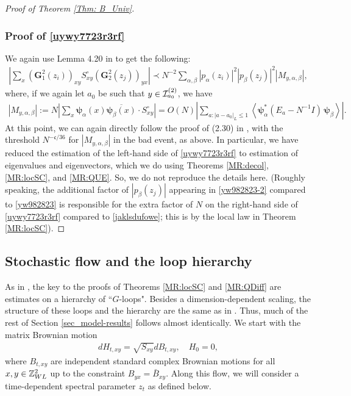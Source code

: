 \begin{proof}[Proof of Theorem \ref{Thm: B_Univ}]
\subsubsection*{Proof of \eqref{uywy7723r3rf}}
We again use Lemma 4.20 in \cite{Xu:2024aa} to get the following:
%
\begin{align}
\left|  \sum_{  x}\left(\mathbf{G}_1^2\left(z_i\right)\right)_{xy} S_{x y}^{\circ}\left(\mathbf{G}_2^2\left(z_j\right)\right)_{yx}\right|
\prec N^{-2} \sum_{\alpha,\beta} |p_\alpha(z_i)|^2|p_\beta(z_j)|^2 \left|M_{y,\alpha,\beta}\right|,\label{yw982823-2}
\end{align}
%
where, if we again let $a_{0}$ be such that $y\in{\cal I}_{a_{0}}^{(2)}$, we have
%
\begin{align*}
|M_{y,\alpha,\beta}|:= N\left| \sum_{x}\boldsymbol{\psi}_\alpha(x) \overline{\boldsymbol{\psi}_{\beta}(x)}\cdot S^{\circ}_{xy}\right|= O(N)\left| \sum_{a: |a-a_0|_{L}\le 1}
     \left\langle \boldsymbol{\psi}^*_\alpha \left(E_a-N^{-1} I\right) \,\boldsymbol{\psi}_\beta\right\rangle\right|.
\end{align*}
%
At this point, we can again directly follow the proof of (2.30) in \cite{YY_25}, with the threshold $N^{-\mathfrak{c}/36}$ for $|M_{y,\alpha,\beta}|$ in the bad event, as above. In particular, we have reduced the estimation of the left-hand side of \eqref{uywy7723r3rf} to estimation of eigenvalues and eigenvectors, which we do using Theorems \ref{MR:decol}, \ref{MR:locSC}, and \ref{MR:QUE}. So, we do not reproduce the details here. (Roughly speaking, the additional factor of $|p_{\beta}(z_{j})|$ appearing in \eqref{yw982823-2} compared to \eqref{yw982823} is responsible for the extra factor of $N$ on the right-hand side of \eqref{uywy7723r3rf} compared to \eqref{jaklsdufowe}; this is by the local law in Theorem \ref{MR:locSC}).
\end{proof}





 
\subsection{Stochastic flow and the loop hierarchy}
As in \cite{YY_25}, the key to the proofs of Theorems \ref{MR:locSC} and \ref{MR:QDiff} are estimates on a hierarchy of ``$G$-loops". Besides a dimension-dependent scaling, the structure of these loops and the hierarchy are the same as in \cite{YY_25}. Thus, much of the rest of Section \ref{sec_model-results} follows \cite{YY_25} almost identically. We start with the matrix Brownian motion
\begin{align*}
dH_{t,xy}=\sqrt{S_{xy}}dB_{t,xy}, \quad H_{0}=0, 
\end{align*}
where $B_{t,xy}$ are independent standard complex Brownian motions for all $x,y\in \mathbb{Z}_{WL}^{2}$ up to the constraint  $B_{yx} = \bar  B_{xy}$. Along this flow, we will consider a time-dependent spectral parameter $z_{t}$ as defined below.


